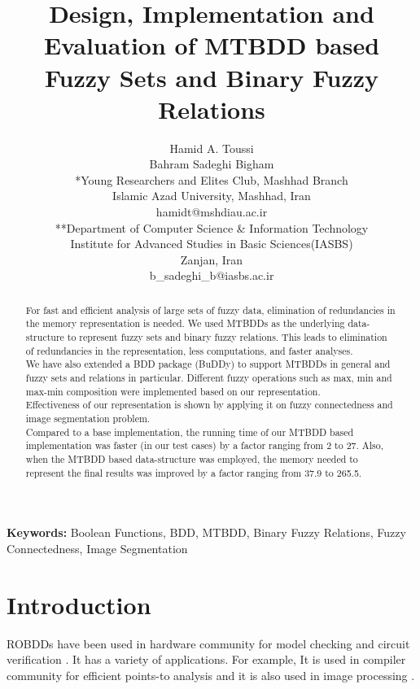 \documentclass[4pt]{article}
\begin{document}
\title{Design, Implementation and Evaluation of MTBDD based Fuzzy Sets and Binary Fuzzy Relations}


\author{Hamid A. Toussi\\
        Bahram Sadeghi Bigham\\
        *Young Researchers and Elites Club, Mashhad  Branch\\Islamic Azad University, Mashhad, Iran\\hamidt@mshdiau.ac.ir\\
        **Department of Computer Science \& Information Technology\\Institute for Advanced Studies in Basic Sciences(IASBS)\\Zanjan, Iran\\
              b\_sadeghi\_b@iasbs.ac.ir
}
        

\date{}

\maketitle


\begin{abstract}
For fast and efficient analysis of large sets of fuzzy data, elimination of redundancies in the  memory representation is needed. We used MTBDDs as the underlying data-structure to represent fuzzy sets and binary fuzzy relations. This leads to elimination of redundancies in the representation, less computations, and faster analyses. \\
We have also extended a  BDD package (BuDDy) to support MTBDDs in general and fuzzy sets and relations in particular. Different fuzzy operations such as max, min and max-min composition were implemented based on our representation.\\
Effectiveness of our representation is shown by applying it on fuzzy connectedness and image segmentation problem.\\
Compared to a base implementation, the running time of our MTBDD based implementation was faster (in our test cases) by a factor ranging from 2 to 27. Also, when the MTBDD based data-structure was employed, the memory needed to represent the final results was improved by a factor ranging from 37.9 to 265.5.
\end{abstract}

{\bf Keywords:}
Boolean Functions, BDD, MTBDD,
Binary Fuzzy Relations,
Fuzzy Connectedness, Image Segmentation

\section{Introduction}
\label{introduction}
ROBDDs have been used in hardware community for model checking and circuit verification \cite{symbol_mc}. It has a variety of applications. For example, It is used in compiler community for efficient points-to analysis \cite{pt_bdd,cs_bdd,pt_xbdd} and it is also used in image processing \cite{image_bdd,image_bryant}.
\end{document}
